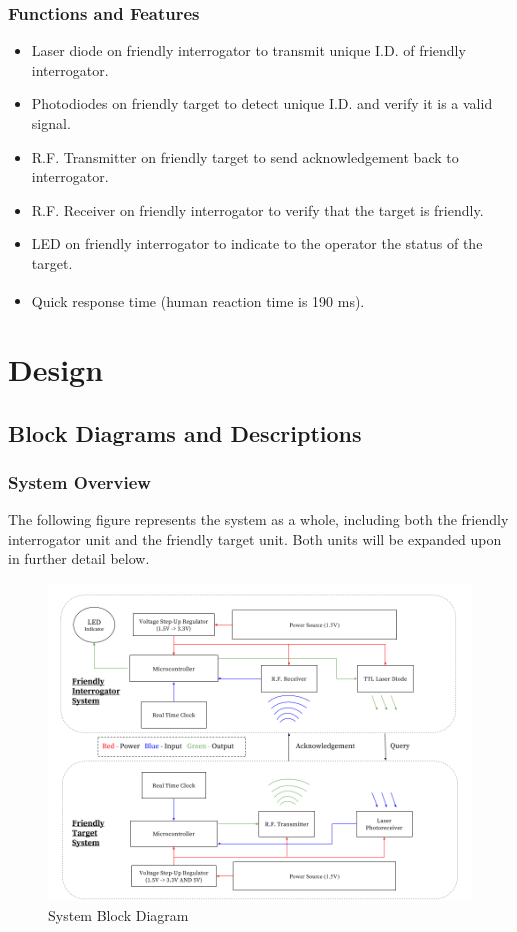 \documentclass[letterpaper,10pt]{article}
\begin{document}
\begin{spacing}{1.15}
\subsubsection{Functions and Features}
\begin{itemize}
	\item Laser diode on friendly interrogator to transmit unique I.D. of friendly interrogator.
	\item Photodiodes on friendly target to detect unique I.D. and verify it is a valid signal.
	\item R.F. Transmitter on friendly target to send acknowledgement back to interrogator.
	\item R.F. Receiver on friendly interrogator to verify that the target is friendly.
	\item LED on friendly interrogator to indicate to the operator the status of the target.
	\item Quick response time (human reaction time is 190 ms\textsuperscript{\cite{Reaction_Times}}).
\end{itemize}
\clearpage

\section{Design}
\subsection{Block Diagrams and Descriptions}
\subsubsection{System Overview}
The following figure represents the system as a whole, including both the friendly interrogator unit and the friendly target unit. Both units will be expanded upon in further detail below.
\begin{figure} [H]
	\centering
	\includegraphics[scale=0.45]{System_Block_Diagram.png}
	\caption{System Block Diagram\label{fig:system-block-diagram}}
\end{figure}


\end{spacing}
\end{document}
